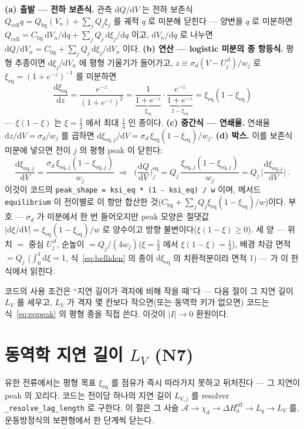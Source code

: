 \documentclass[11pt,a4paper]{article}
\newcommand{\dd}{\mathrm{d}}
\newcommand{\eff}{\mathrm{eff}}
\newcommand{\eq}{\mathrm{eq}}
\newcommand{\cell}{\mathrm{cell}}
\newcommand{\bg}{\mathrm{bg}}
\newcommand{\code}[1]{\texttt{#1}}
\begin{document}
\textbf{(a) 출발 — 전하 보존식.} 관측 $\dd Q/\dd V$ 는 전하 보존식 $Q_\cell q=Q_\bg(V_n)+\sum_jQ_j\xi_j$ 를 궤적
$q$ 로 미분해 닫힌다 — 양변을 $q$ 로 미분하면 $Q_\cell=C_\bg\,\dd V_n/\dd q+\sum_jQ_j\,\dd\xi_j/\dd q$ 이고,
$\dd V_n/\dd q$ 로 나누면 $\dd Q/\dd V_n=C_\bg+\sum_jQ_j\,\dd\xi_j/\dd V_n$ 이다. \textbf{(b) 연산 — logistic
미분의 종 항등식.} 평형 추종이면 $\dd\xi_j/\dd V_n$ 에 평형 기울기가 들어가고, $z\equiv\sigma_d(V-U_j^{\,d})/w_j$ 로
$\xi_\eq=(1+e^{-z})^{-1}$ 를 미분하면
\begin{equation}
\frac{\dd\xi_\eq}{\dd z}=\frac{e^{-z}}{(1+e^{-z})^2}
=\underbrace{\frac{1}{1+e^{-z}}}_{\xi_\eq}\cdot\underbrace{\frac{e^{-z}}{1+e^{-z}}}_{1-\xi_\eq}
=\xi_\eq(1-\xi_\eq)
\label{eq:belliden}
\end{equation}
— $\xi(1-\xi)$ 는 $\xi=\tfrac12$ 에서 최대 $\tfrac14$ 인 종이다. \textbf{(c) 중간식 — 연쇄율.} 연쇄율
$\dd z/\dd V=\sigma_d/w_j$ 를 곱하면 $\dd\xi_{\eq,j}/\dd V=\sigma_d\,\xi_\eq(1-\xi_\eq)/w_j$. \textbf{(d) 박스.}
이를 보존식 미분에 넣으면 전이 $j$ 의 평형 peak 이 닫힌다:
\begin{equation}
\frac{\dd\xi_{\eq,j}}{\dd V}=\frac{\sigma_d\,\xi_{\eq,j}(1-\xi_{\eq,j})}{w_j}
\;\Longrightarrow\;
\boxed{\;\Big(\frac{\dd Q}{\dd V}\Big)^\eq_j
=Q_j\,\frac{\xi_{\eq,j}(1-\xi_{\eq,j})}{w_j}
=Q_j\,\Big|\frac{\dd\xi_{\eq,j}}{\dd V}\Big|\;.}
\label{eq:eqpeak}
\end{equation}
이것이 코드의 \code{peak\_shape = ksi\_eq * (1 - ksi\_eq) / w} 이며, 메서드 \code{equilibrium} 이 전이별로 이 항만
합산한 것($C_\bg+\sum_jQ_j\xi_\eq(1-\xi_\eq)/w$)이다. 부호 — $\sigma_d$ 가 미분에서 한 번 들어오지만 peak 모양은
절댓값 $|\dd\xi/\dd V|=\xi_\eq(1-\xi_\eq)/w$ 로 양수이고 방향 불변이다($\xi(1-\xi)\ge0$). 세 양 — 위치 $=$ 중심
$U_j^{\,d}$, 순높이 $=Q_j/(4w_j)$($\xi=\tfrac12$ 에서 $\xi(1-\xi)=\tfrac14$), 배경 차감 면적 $=Q_j$
($\int_0^1\dd\xi=1$, 식~\eqref{eq:belliden} 의 종이 $\dd\xi_\eq$ 의 치환적분이라 면적 $1$) — 가 이 한 식에서 읽힌다.

코드의 사용 조건은 ``지연 길이가 격자에 비해 작을 때''다 — 다음 절이 그 지연 길이 $L_V$ 를 세우고, $L_V$ 가 격자
몇 칸보다 작으면(또는 동역학 키가 없으면) 코드는 식~\eqref{eq:eqpeak} 의 평형 종을 직접 쓴다. 이것이 $|I|\to0$ 환원이다.

\section{동역학 지연 길이 $L_V$ (N7)}\label{sec:lag}
유한 전류에서는 평형 목표 $\xi_\eq$ 를 점유가 즉시 따라가지 못하고 뒤처진다 — 그 지연이 peak 의 꼬리다. 코드는 전이당
하나의 지연 길이 $L_{V,j}$ 를 resolver \code{\_resolve\_lag\_length} 로 구한다. 이 절은 그 사슬
$\mathcal A\to\chi_d\to\Delta H_a^\eff\to L_q\to L_V$ 를, 운동방정식의 보편형에서 한 단계씩 닫는다.
\end{document}
